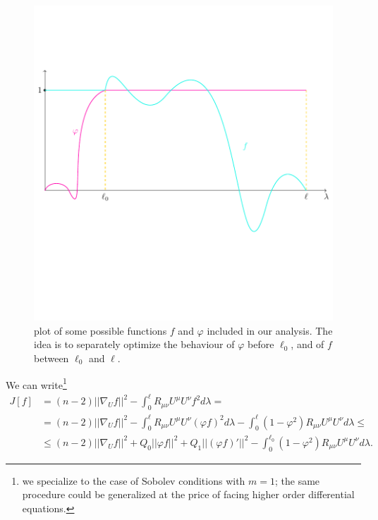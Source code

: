 \begin{figure}
    \centering
    \includegraphics[scale=0.6]{Immagini/euler-lagrange-functions/euler-lagrange-functions.pdf}
    \caption[]{plot of some possible functions \(f\) and \(\varphi\) included in our analysis. The idea is to separately optimize the behaviour of \(\varphi\) before \(\ell_0\), and of \(f\) between \(\ell_0\) and \(\ell\).}
\end{figure}

We can write\footnote{we specialize to the case of Sobolev conditions with \(m = 1\); the same procedure could be generalized at the price of facing higher order differential equations.}
\begin{align*}
    J[f] &= (n - 2)\vert\vert\nabla_U f \vert\vert^2 - \int_0^{\ell} R_{\mu\nu}U^{\mu}U^{\nu} f^2 d\lambda =\\
    &= (n - 2)\vert\vert\nabla_U f \vert\vert^2 - \int_0^{\ell} R_{\mu\nu}U^{\mu}U^{\nu} \left(\varphi f\right)^2 d\lambda - \int_0^{\ell} \left(1 - \varphi^2\right) R_{\mu\nu}U^{\mu}U^{\nu} d\lambda \le \\
    &\le (n - 2)\vert\vert\nabla_U f \vert\vert^2 + Q_0\vert\vert\varphi f\vert\vert^2 + Q_1\vert\vert\left(\varphi f\right)'\vert\vert^2 - \int_0^{\ell_0} \left(1 - \varphi^2\right) R_{\mu\nu}U^{\mu}U^{\nu} d\lambda.
\end{align*}

